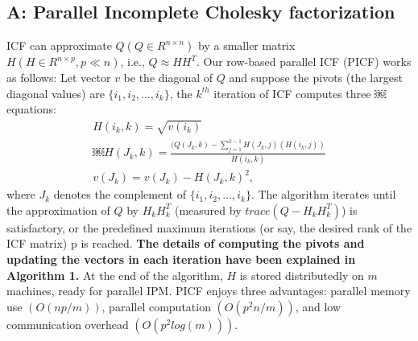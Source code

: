 \documentclass[12pt]{article}
\begin{document}
\subsection{A: Parallel Incomplete Cholesky factorization }
ICF can approximate $Q (Q \in R^{n\times n})$ by a smaller matrix $H (H \in R^{n\times p},p \ll n)$, i.e., $Q \approx HH^T$.
Our row-based parallel ICF (PICF) works as follows: Let vector $v$ be the diagonal of $Q$ and suppose the pivots (the largest diagonal values) are $\{i_1, i_2, . . . , i_k\}$, the $k^{th}$ iteration of ICF computes three
￼equations:
\begin{gather}
H(i_k, k) = \sqrt{v(i_k)}\\
￼H(J_k, k) = \frac{(Q(J_k, k) - \sum_{j=1}^{k-1}{H(J_k, j)(H(i_k, j))}}{H(i_k, k)}\\
v(J_k) = v(J_k) - H(J_k, k)^2, 
\end{gather}
where $J_k$ denotes the complement of $\{i_1 , i_2 , . . . , i_k \}$. The algorithm iterates until the approximation of $Q$ by $H_k H_ k^T$ (measured by $trace(Q - H_k H_k^T )$) is satisfactory, or the predefined maximum iterations (or say, the desired rank of the ICF matrix) p is reached.\newline
\newline
{\bf The details of computing the pivots and updating the vectors in each iteration have been explained in Algorithm 1.}
\newline
At the end of the algorithm, $H$ is stored distributedly on $m$ machines, ready for parallel IPM. PICF enjoys three advantages: parallel memory use $(O(np/m))$, parallel computation $(O(p^2n/m))$, and low communication overhead $(O(p^2 log(m)))$. 
\end{document}

